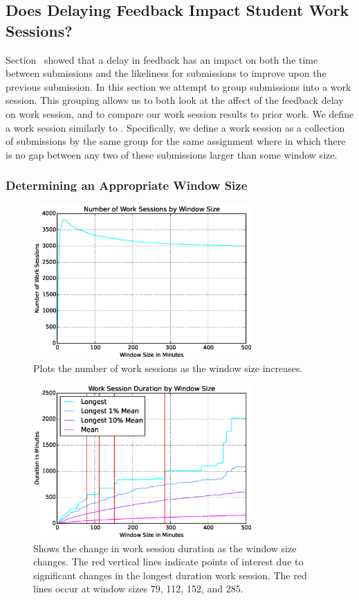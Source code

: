 \subsection{Does Delaying Feedback Impact Student Work Sessions?} 
Section~ showed that a delay in feedback has an impact
on both the time between submissions and the likeliness for submissions to
improve upon the previous submission. In this section we attempt to group
submissions into a work session. This grouping allows us to both look at the
affect of the feedback delay on work session, and to compare our work session
results to prior work. We define a work session similarly to
\spacco{}. Specifically, we define a work session as a collection of
submissions by the same group for the same assignment where in which there is
no gap between any two of these submissions larger than some window size.

\subsubsection{Determining an Appropriate Window Size}

\begin{figure}[!t]
\centering \includegraphics[width=3.3in]{graphs/Number_of_Work_Sessions_by_Window_Size.eps}
\caption{Plots the number of work sessions as the window size increases.}
\end{figure}

\begin{figure}[!t]
\centering \includegraphics[width=3.3in]{graphs/Work_Session_Duration_by_Window_Size.eps}
\caption{Shows the change in work session duration as the window size
  changes. The red vertical lines indicate points of interest due to
  significant changes in the longest duration work session. The red lines occur
  at window sizes 79, 112, 152, and 285.}
\end{figure}

